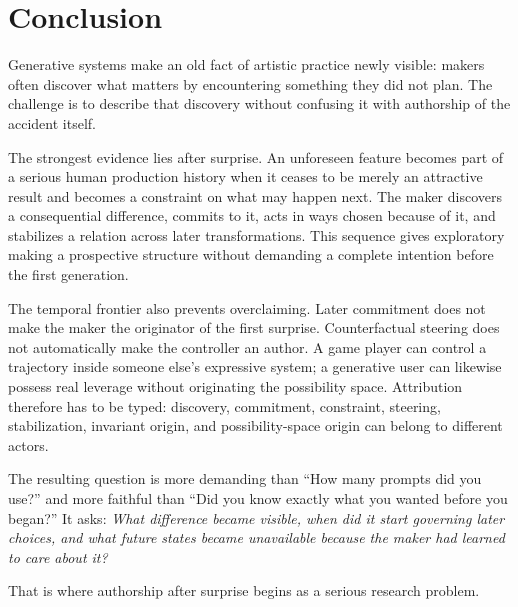 \documentclass[11pt]{article}
\begin{document}
\section{Conclusion}

Generative systems make an old fact of artistic practice newly visible: makers often discover what matters by encountering something they did not plan. The challenge is to describe that discovery without confusing it with authorship of the accident itself.

The strongest evidence lies after surprise. An unforeseen feature becomes part of a serious human production history when it ceases to be merely an attractive result and becomes a constraint on what may happen next. The maker discovers a consequential difference, commits to it, acts in ways chosen because of it, and stabilizes a relation across later transformations. This sequence gives exploratory making a prospective structure without demanding a complete intention before the first generation.

The temporal frontier also prevents overclaiming. Later commitment does not make the maker the originator of the first surprise. Counterfactual steering does not automatically make the controller an author. A game player can control a trajectory inside someone else's expressive system; a generative user can likewise possess real leverage without originating the possibility space. Attribution therefore has to be typed: discovery, commitment, constraint, steering, stabilization, invariant origin, and possibility-space origin can belong to different actors.

The resulting question is more demanding than ``How many prompts did you use?'' and more faithful than ``Did you know exactly what you wanted before you began?'' It asks: \emph{What difference became visible, when did it start governing later choices, and what future states became unavailable because the maker had learned to care about it?}

That is where authorship after surprise begins as a serious research problem.
\end{document}
